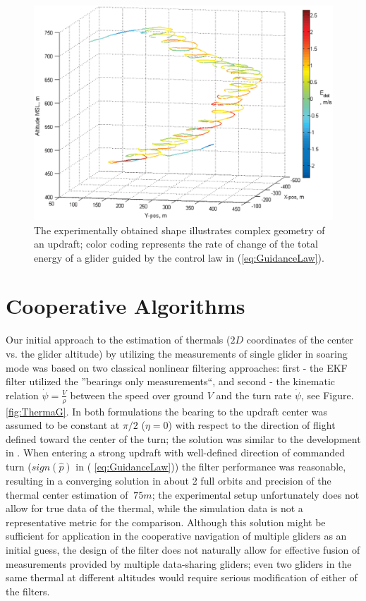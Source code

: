 \documentclass{ifacconf}
\begin{document}
\begin{figure}[thpb]
  \centering
  \includegraphics[scale=0.3]{Figures/BendedThermal.eps}
  \caption{The experimentally obtained shape illustrates complex geometry of an updraft; color coding represents the rate of change of the total energy of a glider guided by the control law in (\ref{eq:GuidanceLaw}).}
  \label{fig:ThermaShape}
\end{figure}

\section{Cooperative Algorithms}
\label{sec:CoopAlgs}
Our initial approach to the estimation of thermals ($2D$ coordinates of the center vs. the glider altitude) by utilizing the measurements of single glider in soaring mode was based on two classical nonlinear filtering approaches: first - the EKF  filter utilized the ''bearings only measurements``, and second - the kinematic relation $\dot{\psi}=\frac{V}{\rho}$ between the speed over ground $V$ and the turn rate $\dot{\psi}$, see Figure.\ref{fig:ThermaG}. In both formulations the bearing to the updraft center was assumed to be constant at $\pi/2$ ($\eta=0$)  with respect to the direction of flight defined toward the center of the turn; the solution was similar to the development in \cite{Dobrokhodov:2008}. When entering a strong updraft with well-defined direction of commanded turn ($sign(\hat{p})$ in ( \ref{eq:GuidanceLaw})) the filter performance was reasonable, resulting in a converging solution in about 2 full orbits and precision of the thermal center estimation of $~75m$; the experimental setup unfortunately does not allow for true data of the thermal, while the simulation data is not a representative metric for the comparison. Although this solution might be sufficient for application in the cooperative navigation of multiple gliders as an initial guess, the design of the filter does not naturally allow for effective fusion of measurements provided by multiple data-sharing gliders; even two gliders in the same thermal at different altitudes would require serious modification of either of the filters.
\end{document}
